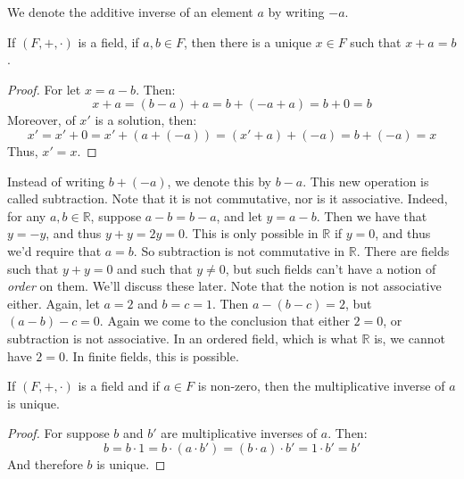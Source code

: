 \documentclass[crop=false,class=book,oneside]{standalone}
\begin{document}
            We denote the additive inverse of an element $a$ by
            writing $\minus{a}$.
            \begin{theorem}
                If $(F,+,\cdot)$ is a field, if $a,b\in{F}$, then
                there is a unique $x\in{F}$ such that
                $x+a=b$.
            \end{theorem}
            \begin{proof}
                For let $x=a-b$. Then:
                \begin{equation}
                    x+a=(b-a)+a
                    =b+(-a+a)
                    =b+0
                    =b
                \end{equation}
                Moreover, of $x'$ is a solution, then:
                \begin{equation}
                    x'=x'+0=x'+(a+(\minus{a}))=
                    (x'+a)+(\minus{a})=b+(\minus{a})=x
                \end{equation}
                Thus, $x'=x$.
            \end{proof}
            Instead of writing $b+(\minus{a})$, we
            denote this by $b-a$. This new operation is called
            subtraction. Note that it is not commutative, nor
            is it associative. Indeed, for any $a,b\in\mathbb{R}$,
            suppose $a-b=b-a$, and let $y=a-b$. Then we have that
            $y=\minus{y}$, and thus $y+y=2y=0$. This is only possible
            in $\mathbb{R}$ if $y=0$, and thus we'd require that
            $a=b$. So subtraction is not commutative in $\mathbb{R}$.
            There are fields such that $y+y=0$ and such that
            $y\ne{0}$, but such fields can't have a notion of
            \textit{order} on them. We'll discuss these later.
            Note that the notion is not associative either. Again,
            let $a=2$ and $b=c=1$. Then $a-(b-c)=2$, but
            $(a-b)-c=0$. Again we come to the conclusion that either
            $2=0$, or subtraction is not associative. In an ordered
            field, which is what $\mathbb{R}$ is, we cannot have
            $2=0$. In finite fields, this is possible.
            \begin{theorem}
                If $(F,+,\cdot)$ is a field and if $a\in{F}$
                is non-zero, then the multiplicative inverse
                of $a$ is unique.
            \end{theorem}
            \begin{proof}
                For suppose $b$ and $b'$ are multiplicative inverses
                of $a$. Then:
                \begin{equation}
                    b=b\cdot{1}=b\cdot(a\cdot{b}')=
                    (b\cdot{a})\cdot{b}'=1\cdot{b}'=b'
                \end{equation}
                And therefore $b$ is unique.
            \end{proof}
\end{document}
